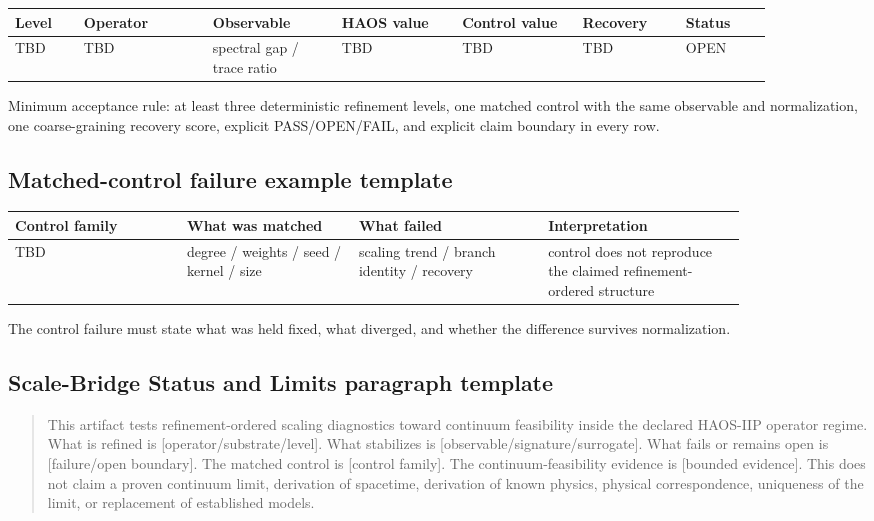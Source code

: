 \documentclass[11pt]{article}
\begin{document}
\begin{center}
\small
\begin{tabular}{p{0.08\linewidth}p{0.15\linewidth}p{0.15\linewidth}p{0.14\linewidth}p{0.14\linewidth}p{0.12\linewidth}p{0.10\linewidth}}
\toprule
Level & Operator & Observable & HAOS value & Control value & Recovery & Status \\
\midrule
TBD & TBD & spectral gap / trace ratio & TBD & TBD & TBD & OPEN \\
\bottomrule
\end{tabular}
\end{center}

Minimum acceptance rule: at least three deterministic refinement levels, one matched control with the same observable and normalization, one coarse-graining recovery score, explicit PASS/OPEN/FAIL, and explicit claim boundary in every row.

\subsection{Matched-control failure example template}

\begin{center}
\small
\begin{tabular}{p{0.20\linewidth}p{0.20\linewidth}p{0.22\linewidth}p{0.23\linewidth}}
\toprule
Control family & What was matched & What failed & Interpretation \\
\midrule
TBD & degree / weights / seed / kernel / size & scaling trend / branch identity / recovery & control does not reproduce the claimed refinement-ordered structure \\
\bottomrule
\end{tabular}
\end{center}

The control failure must state what was held fixed, what diverged, and whether the difference survives normalization.

\subsection{Scale-Bridge Status and Limits paragraph template}

\begin{quote}
This artifact tests refinement-ordered scaling diagnostics toward continuum feasibility inside the declared HAOS-IIP operator regime. What is refined is [operator/substrate/level]. What stabilizes is [observable/signature/surrogate]. What fails or remains open is [failure/open boundary]. The matched control is [control family]. The continuum-feasibility evidence is [bounded evidence]. This does not claim a proven continuum limit, derivation of spacetime, derivation of known physics, physical correspondence, uniqueness of the limit, or replacement of established models.
\end{quote}
\end{document}

